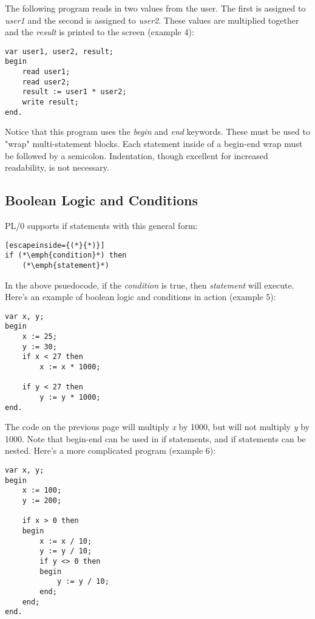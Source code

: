 \documentclass[12pt]{memoir}
\begin{document}
The following program reads in two values from the user. The first is assigned to \emph{user1}
and the second is assigned to \emph{user2}. These values are multiplied together and
the \emph{result} is printed to the screen (example 4):
\begin{lstlisting}
var user1, user2, result;
begin
    read user1;
    read user2;
    result := user1 * user2;
    write result;
end.
\end{lstlisting}
Notice that this program uses the \emph{begin} and \emph{end} keywords. These must be used
to "wrap" multi-statement blocks. Each statement inside of a begin-end wrap must be followed
by a semicolon. Indentation, though excellent for increased readability, is not necessary.

\subsection*{Boolean Logic and Conditions}
PL/0 supports if statements with this general form:
\begin{lstlisting}[escapeinside={(*}{*)}]
if (*\emph{condition}*) then
    (*\emph{statement}*)
\end{lstlisting}
In the above psuedocode, if the \emph{condition} is true, then \emph{statement}
will execute. Here's an example of boolean logic and conditions in action (example 5):
\begin{lstlisting}
var x, y;
begin
    x := 25;
    y := 30;
    if x < 27 then
        x := x * 1000;

    if y < 27 then
        y := y * 1000;
end.
\end{lstlisting}

\pagebreak

The code on the previous page will multiply \emph{x} by 1000, but will not multiply
\emph{y} by 1000. Note that begin-end can be used in if statements, and if statements
can be nested. Here's a more complicated program (example 6):
\begin{lstlisting}
var x, y;
begin
    x := 100;
    y := 200;
    
    if x > 0 then
    begin
        x := x / 10;
        y := y / 10;
        if y <> 0 then
        begin
            y := y / 10;
        end;
    end;
end.
\end{lstlisting}
\end{document}

